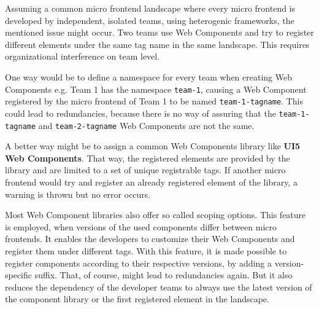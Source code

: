 Assuming a common micro frontend landscape where every micro frontend is developed by independent, isolated teams, using heterogenic frameworks, the mentioned issue might occur. Two teams use Web Components and try to register different elements under the same tag name in the same landscape. This requires organizational interference on team level.

One way would be to define a namespace for every team when creating Web Components e.g. Team 1 has the namespace \texttt{team-1}, causing a Web Component registered by the micro frontend of Team 1 to be named \texttt{team-1-tagname}. This could lead to redundancies, because there is no way of assuring that the \texttt{team-1-tagname} and \texttt{team-2-tagname} Web Components are not the same.\cite{wc_best_practices}

A better way might be to assign a common Web Components library like \textbf{UI5 Web Components}. That way, the registered elements are provided by the library and are limited to a set of unique registrable tags. If another micro frontend would try and register an already registered element of the library, a warning is thrown but no error occurs.

Most Web Component libraries also offer so called scoping options. This feature is employed, when versions of the used components differ between micro frontends. It enables the developers to customize their Web Components and register them under different tags. With this feature, it is made possible to register components according to their respective versions, by adding a version-specific suffix. That, of course, might lead to redundancies again. But it also reduces the dependency of the developer teams to always use the latest version of the component library or the first registered element in the landscape. \cite{ui5_webcomponents_scoping} \cite{openwc_scoping}




